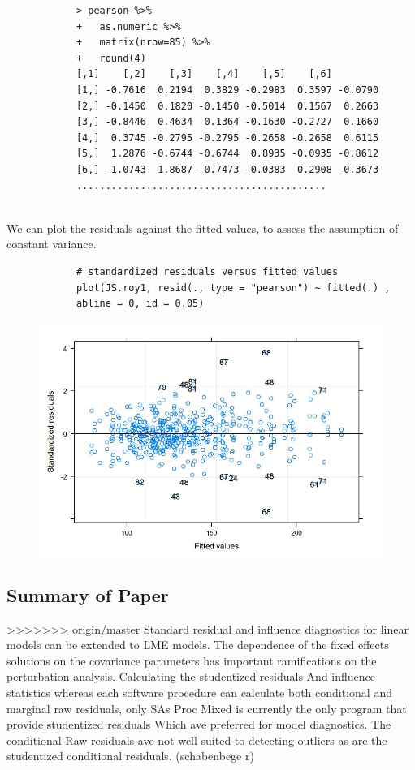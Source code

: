 \documentclass[12pt, a4paper]{report}
\theoremstyle{plain}
\theoremstyle{definition}
\theoremstyle{remark}
\begin{document}
		
		\begin{framed}
			\begin{verbatim}
			> pearson %>%
			+   as.numeric %>% 
			+   matrix(nrow=85) %>%
			+   round(4) 
			[,1]    [,2]    [,3]    [,4]    [,5]    [,6]
			[1,] -0.7616  0.2194  0.3829 -0.2983  0.3597 -0.0790
			[2,] -0.1450  0.1820 -0.1450 -0.5014  0.1567  0.2663
			[3,] -0.8446  0.4634  0.1364 -0.1630 -0.2727  0.1660
			[4,]  0.3745 -0.2795 -0.2795 -0.2658 -0.2658  0.6115
			[5,]  1.2876 -0.6744 -0.6744  0.8935 -0.0935 -0.8612
			[6,] -1.0743  1.8687 -0.7473 -0.0383  0.2908 -0.3673
			...........................................
			
			\end{verbatim}
		\end{framed}
		
		We can plot the residuals against the fitted values, to assess the assumption of constant variance. 
		\begin{framed}
			\begin{verbatim}
			# standardized residuals versus fitted values 
			plot(JS.roy1, resid(., type = "pearson") ~ fitted(.) , 
			abline = 0, id = 0.05)
			\end{verbatim}
		\end{framed}
		\begin{figure}[h!]
			\centering
			\includegraphics[width=0.9\linewidth]{images/Residuals-JS-Roy}
			\caption{}
			\label{fig:Residuals-JS-Roy}
		\end{figure}
		

		

\subsection{Summary of Paper}
>>>>>>> origin/master
Standard residual and influence diagnostics for linear models can be extended to LME models.
The dependence of the fixed effects solutions on the covariance parameters has important ramifications on the perturbation analysis.	
Calculating the studentized residuals-And influence statistics whereas each software procedure can calculate both conditional and marginal raw residuals, only SAs Proc Mixed is currently the only program that provide studentized residuals Which ave preferred for model diagnostics. The conditional Raw residuals ave not well suited to detecting outliers as are the studentized conditional residuals. (schabenbege r)
\end{document}
